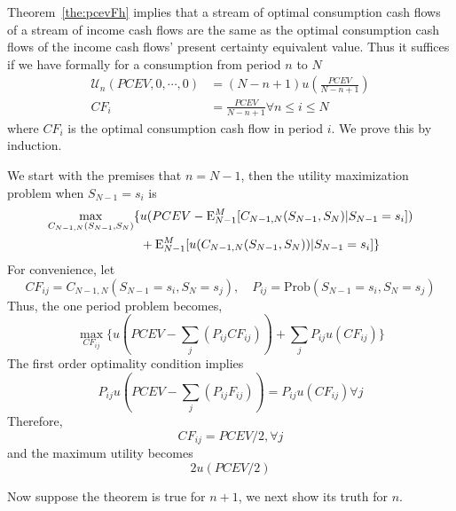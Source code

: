 \proof 
Theorem~\ref{the:pcevFh} implies that a stream of optimal consumption cash flows of a stream of income cash flows are the same as the optimal consumption cash flows of the income cash flows' present certainty equivalent value. Thus it suffices if we have
formally for a consumption from period $n$ to $N$
\begin{align}
\mathcal{U}_n(PCEV,0, \cdots, 0) &= (N-n+1)u(\frac{PCEV}{N-n+1} )\\ 
CF_{i} & = \frac{PCEV}{N-n+1} \forall n\leq i\leq N 
\end{align}
where $CF_i$ is the optimal consumption cash flow in period $i$.
We prove this by induction. 

We start with the premises that $n=N-1$, then the utility maximization problem when $S_{N-1} = s_i$ is
\begin{align*}
\max_{C_{N-1,N}(S_{N-1},S_N)} \{ &u(PCEV -\mathrm{E}^M_{N-1}[C_{N-1,N}(S_{N-1},S_N)|S_{N-1}=s_i]) \\&+ \mathrm{E}_{N-1}^M[u(C_{N-1,N}(S_{N-1},S_N))|S_{N-1}=s_i]\}
\end{align*}
For convenience, let 
\[CF_{ij} = C_{N-1,N}(S_{N-1} =s_i, S_{N} = s_j), \quad  P_{ij} = \text{Prob} (S_{N-1} =s_i, S_{N} = s_j) \]
Thus, the one period problem becomes,
\[ \max_{CF_{ij}} \{ u(PCEV- \sum_{j}(P_{ij}CF_{ij})) +\sum_{j}P_{ij}u(CF_{ij}) \}\]
The first order optimality condition implies
\[ P_{ij}u(PCEV- \sum_{j}(P_{ij}F_{ij})) = P_{ij} u(CF_{ij}) \forall j \] 
Therefore,
\[CF_{ij} =  PCEV/2, \forall j \]
and the maximum utility becomes 
\[2u(PCEV /2) \]

Now suppose the theorem is true for $n+1$, we next show its truth for $n$. 



